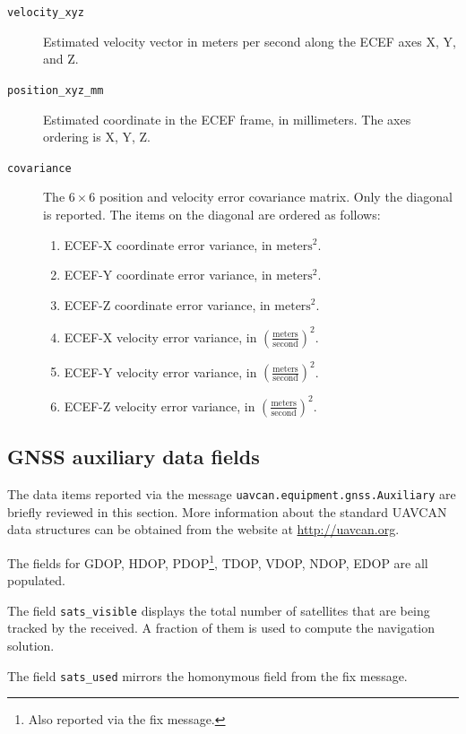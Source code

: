 \documentclass{zubaxdoc}
\begin{document}
\begin{description}
    \item[\texttt{velocity\_xyz}] Estimated velocity vector in meters per second along the ECEF axes X, Y, and Z.
    
    \item[\texttt{position\_xyz\_mm}] Estimated coordinate in the ECEF frame, in millimeters.
    The axes ordering is X, Y, Z.
    
    \item[\texttt{covariance}] The $6\times6$ position and velocity error covariance matrix.
    Only the diagonal is reported. The items on the diagonal are ordered as follows:
    \begin{enumerate}
        \item ECEF-X coordinate error variance, in $\text{meters}^2$.
        \item ECEF-Y coordinate error variance, in $\text{meters}^2$.
        \item ECEF-Z coordinate error variance, in $\text{meters}^2$.
        \item ECEF-X velocity error variance, in $\left(\frac{\text{meters}}{\text{second}}\right)^2$.
        \item ECEF-Y velocity error variance, in $\left(\frac{\text{meters}}{\text{second}}\right)^2$.
        \item ECEF-Z velocity error variance, in $\left(\frac{\text{meters}}{\text{second}}\right)^2$.
    \end{enumerate}
\end{description}

\subsection{GNSS auxiliary data fields}

The data items reported via the message \verb|uavcan.equipment.gnss.Auxiliary| are briefly reviewed
in this section.
More information about the standard UAVCAN data structures can be obtained from the website at
\url{http://uavcan.org}.

The fields for GDOP, HDOP, PDOP\footnote{Also reported via the fix message.}, TDOP, VDOP, NDOP, EDOP
are all populated.

The field \verb|sats_visible| displays the total number of satellites that are being tracked by the received.
A fraction of them is used to compute the navigation solution.

The field \verb|sats_used| mirrors the homonymous field from the fix message.
\end{document}
